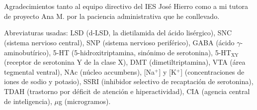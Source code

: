 \section*{}
\thispagestyle{empty}

Agradecimientos tanto al equipo directivo del IES José Hierro como a mi tutora de proyecto Ana M. por la paciencia administrativa que he conllevado.

Abreviaturas usadas: LSD (d-LSD, la dietilamida del ácido lisérgico), SNC (sistema nervioso central), SNP (sistema nervioso periférico), GABA (ácido $\gamma$-aminobutírico), 5-HT (5-hidroxitriptamina, sinónimo de serotonina), 5-HT$_{\textrm{XY}}$ (receptor de serotonina Y de la clase X), DMT (dimetiltriptamina), VTA (área tegmental ventral), NAc (núcleo accumbens), [Na$^+$] y [K$^+$] (concentraciones de iones de sodio y potasio), SSRI (inhibidor selectivo de recaptación de serotonina), TDAH (trastorno por déficit de atención e hiperactividad), CIA (agencia central de inteligencia), $\mu$g (microgramos).

\clearpage
